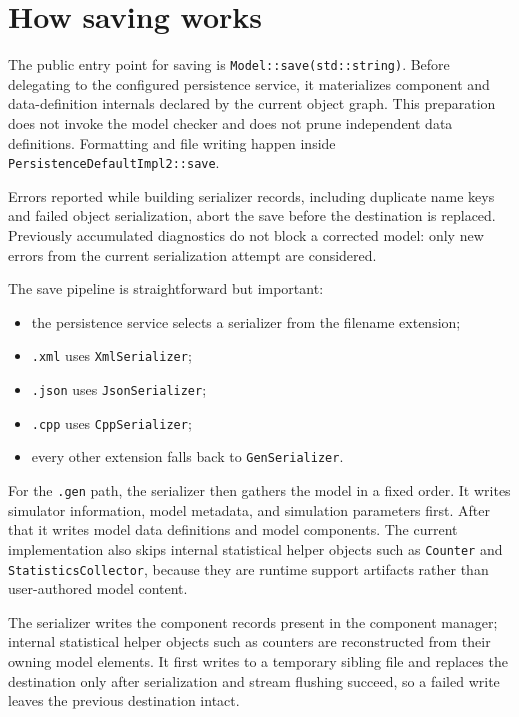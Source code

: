 \section{How saving works}
\label{sec:model-persistence-saving}

The public entry point for saving is \texttt{Model::save(std::string)}. Before
delegating to the configured persistence service, it materializes component
and data-definition internals declared by the current object graph. This
preparation does not invoke the model checker and does not prune independent
data definitions. Formatting and file writing happen inside
\texttt{PersistenceDefaultImpl2::save}.

Errors reported while building serializer records, including duplicate name
keys and failed object serialization, abort the save before the destination is
replaced. Previously accumulated diagnostics do not block a corrected model:
only new errors from the current serialization attempt are considered.

The save pipeline is straightforward but important:
\begin{itemize}
\item the persistence service selects a serializer from the filename
      extension;
\item \texttt{.xml} uses \texttt{XmlSerializer};
\item \texttt{.json} uses \texttt{JsonSerializer};
\item \texttt{.cpp} uses \texttt{CppSerializer};
\item every other extension falls back to \texttt{GenSerializer}.
\end{itemize}

For the \texttt{.gen} path, the serializer then gathers the model in a fixed
order. It writes simulator information, model metadata, and simulation
parameters first. After that it writes model data definitions and model
components. The current implementation also skips internal statistical helper
objects such as \texttt{Counter} and \texttt{StatisticsCollector}, because they
are runtime support artifacts rather than user-authored model content.

The serializer writes the component records present in the component manager;
internal statistical helper objects such as counters are reconstructed from
their owning model elements. It first writes to a temporary sibling file and
replaces the destination only after serialization and stream flushing succeed,
so a failed write leaves the previous destination intact.

